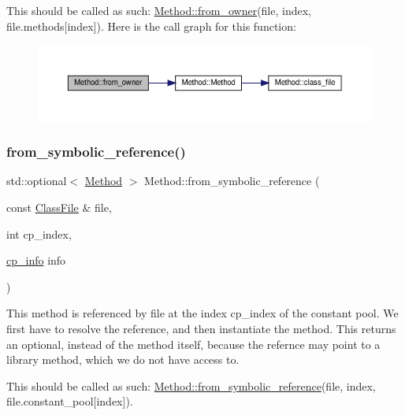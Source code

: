 This should be called as such\+: \hyperlink{classMethod_ad977afdb14569e1108c6b6849fe0b007}{Method\+::from\+\_\+owner}(file, index, file.\+methods\mbox{[}index\mbox{]}). Here is the call graph for this function\+:\nopagebreak
\begin{figure}[H]
\begin{center}
\leavevmode
\includegraphics[width=350pt]{classMethod_ad977afdb14569e1108c6b6849fe0b007_cgraph}
\end{center}
\end{figure}
\mbox{\label{classMethod_adddc54ce699dfb1ba305595507085a29}} 
\subsubsection{\texorpdfstring{from\+\_\+symbolic\+\_\+reference()}{from\_symbolic\_reference()}}
{\footnotesize\ttfamily std\+::optional$<$ \hyperlink{classMethod}{Method} $>$ Method\+::from\+\_\+symbolic\+\_\+reference (\begin{DoxyParamCaption}\item[{const \hyperlink{classfile_8h_a00b46b60bc40e813e9fb1bb049174346}{Class\+File} \&}]{file,  }\item[{int}]{cp\+\_\+index,  }\item[{\hyperlink{structcp__info}{cp\+\_\+info}}]{info }\end{DoxyParamCaption})\hspace{0.3cm}{\ttfamily [static]}}

This method is referenced by {\ttfamily file} at the index {\ttfamily cp\+\_\+index} of the constant pool. We first have to resolve the reference, and then instantiate the method. This returns an optional, instead of the method itself, because the refernce may point to a library method, which we do not have access to.

This should be called as such\+: \hyperlink{classMethod_adddc54ce699dfb1ba305595507085a29}{Method\+::from\+\_\+symbolic\+\_\+reference}(file, index, file.\+constant\+\_\+pool\mbox{[}index\mbox{]}).


